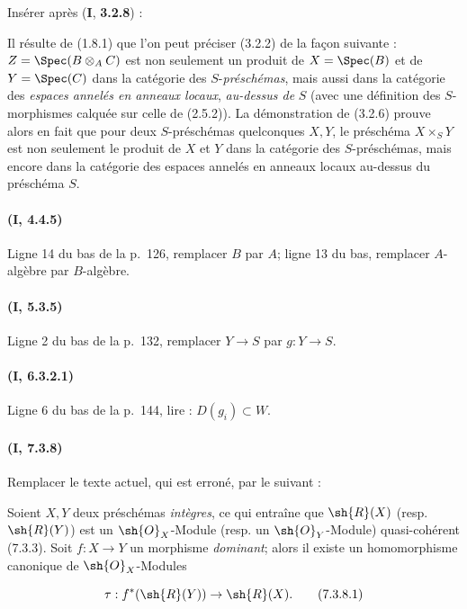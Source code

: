 Insérer après (\textbf{I}, \textbf{3.2.8}) :

\begin{env}[3.2.9]
\label{ega2:addendum:I.3.2.9-fr}
Il résulte de (1.8.1) que l'on peut préciser (3.2.2) de la façon
suivante : $Z=\Spec(B\otimes_A C)$ est non seulement un produit de
$X=\Spec(B)$ et de $Y=\Spec(C)$ dans la catégorie des $S$-\emph{préschémas},
mais aussi dans la catégorie des \emph{espaces annelés en anneaux locaux},
\emph{au-dessus de} $S$ (avec une définition des $S$-morphismes calquée sur
celle de (2.5.2)). La démonstration de (3.2.6) prouve alors en
fait que pour deux $S$-préschémas quelconques $X,Y$, le préschéma
$X\times_S Y$ est non seulement le produit de $X$ et $Y$ dans la
catégorie des $S$-préschémas, mais encore dans la catégorie des espaces
annelés en anneaux locaux au-dessus du préschéma $S$.
\end{env}

\paragraph{(I, 4.4.5)}
Ligne 14 du bas de la p.~126, remplacer $B$ par $A$; ligne 13 du bas,
remplacer $A$-algèbre par $B$-algèbre.

\paragraph{(I, 5.3.5)}
Ligne 2 du bas de la p.~132, remplacer $Y\to S$ par $g:Y\to S$.

\paragraph{(I, 6.3.2.1)}
Ligne 6 du bas de la p.~144, lire : $D(g_i)\subset W$.

\paragraph{(I, 7.3.8)}
Remplacer le texte actuel, qui est erroné, par le suivant :

Soient $X,Y$ deux préschémas \emph{intègres}, ce qui entraîne que
$\sh{R}(X)$ (resp. $\sh{R}(Y)$) est un $\sh{O}_X$-Module (resp. un
$\sh{O}_Y$-Module) quasi-cohérent (7.3.3). Soit $f:X\to Y$ un
morphisme \emph{dominant}; alors il existe un homomorphisme canonique de
$\sh{O}_X$-Modules
\begin{equation}
\label{ega2:addendum:I.7.3.8.1-fr}
  \tau:f^*(\sh{R}(Y))\to\sh{R}(X).
\tag{7.3.8.1}
\end{equation}

